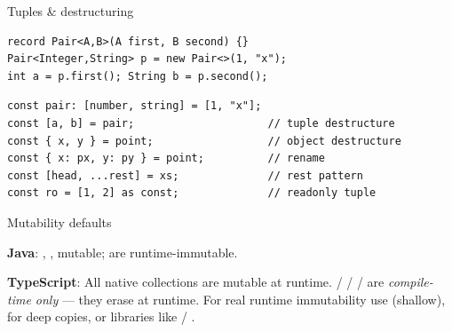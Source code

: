 \documentclass[10pt]{article}
\begin{document}
\begin{construct}{Tuples \& destructuring}
\noindent
\begin{minipage}[t]{0.485\linewidth}
\begin{lstlisting}[style=java, title=Java]
record Pair<A,B>(A first, B second) {}
Pair<Integer,String> p = new Pair<>(1, "x");
int a = p.first(); String b = p.second();
\end{lstlisting}
\end{minipage}\hfill
\begin{minipage}[t]{0.485\linewidth}
\begin{lstlisting}[style=ts, title=TypeScript]
const pair: [number, string] = [1, "x"];
const [a, b] = pair;                     // tuple destructure
const { x, y } = point;                  // object destructure
const { x: px, y: py } = point;          // rename
const [head, ...rest] = xs;              // rest pattern
const ro = [1, 2] as const;              // readonly tuple
\end{lstlisting}
\end{minipage}
\end{construct}

\begin{construct}{Mutability defaults}
\noindent
\begin{minipage}[t]{\linewidth}
\small
\textbf{Java}: , ,  mutable;  are runtime-immutable.\par
\textbf{TypeScript}: All native collections are mutable at runtime.  /  /  /  are \emph{compile-time only} --- they erase at runtime. For real runtime immutability use  (shallow),  for deep copies, or libraries like  / .
\end{minipage}
\end{construct}

\end{document}
